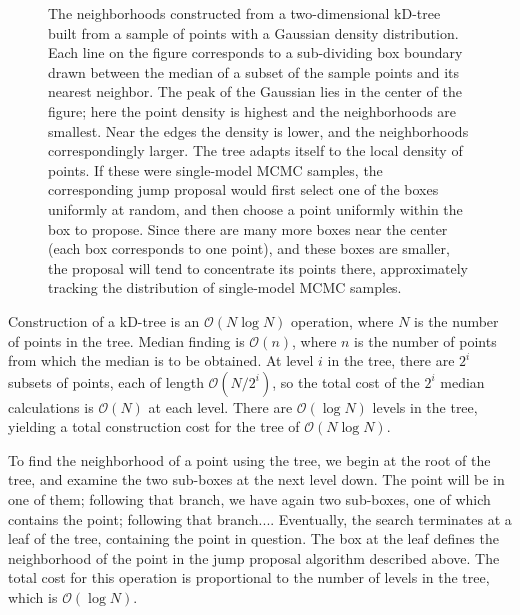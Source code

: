 \documentclass[preprint]{aastex}
\newcommand{\order}[1]{\mathcal{O}\left( #1 \right)}
\begin{document}
\begin{figure}
  \begin{center}
  \end{center}
  \caption{\label{fig:kD-tree} The neighborhoods constructed from a
    two-dimensional kD-tree built from a sample of points with a
    Gaussian density distribution.  Each line on the figure
    corresponds to a sub-dividing box boundary drawn between the
    median of a subset of the sample points and its nearest
    neighbor. The peak of the Gaussian lies in the center of the
    figure; here the point density is highest and the neighborhoods
    are smallest.  Near the edges the density is lower, and the
    neighborhoods correspondingly larger.  The tree adapts itself to
    the local density of points.  If these were single-model MCMC
    samples, the corresponding jump proposal would first select one of
    the boxes uniformly at random, and then choose a point uniformly
    within the box to propose.  Since there are many more boxes near
    the center (each box corresponds to one point), and these boxes
    are smaller, the proposal will tend to concentrate its points
    there, approximately tracking the distribution of single-model
    MCMC samples.}
\end{figure}

Construction of a kD-tree is an $\order{N\log N}$ operation, where $N$
is the number of points in the tree.  Median finding is $\order{n}$,
where $n$ is the number of points from which the median is to be
obtained.  At level $i$ in the tree, there are $2^i$ subsets of
points, each of length $\order{N/2^i}$, so the total cost of the $2^i$
median calculations is $\order{N}$ at each level.  There are
$\order{\log N}$ levels in the tree, yielding a total construction
cost for the tree of $\order{N \log N}$.  

To find the neighborhood of a point using the tree, we begin at the
root of the tree, and examine the two sub-boxes at the next level
down.  The point will be in one of them; following that branch, we
have again two sub-boxes, one of which contains the point; following
that branch....  Eventually, the search terminates at a leaf of the
tree, containing the point in question.  The box at the leaf defines
the neighborhood of the point in the jump proposal algorithm described
above.  The total cost for this operation is proportional to the
number of levels in the tree, which is $\order{\log N}$.


\end{document}
